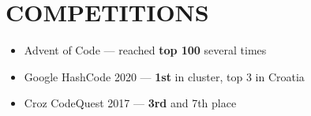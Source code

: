 \documentclass{article}
\begin{document}



\section{COMPETITIONS}
\begin{itemize}
  \itemsep0em
  \item Advent of Code --- reached {\bfseries top 100} several times
  \item Google HashCode 2020 --- {\bfseries 1st} in cluster, top 3 in Croatia
  \item Croz CodeQuest 2017 --- {\bfseries 3rd} and 7th place
\end{itemize}
\end{document}

